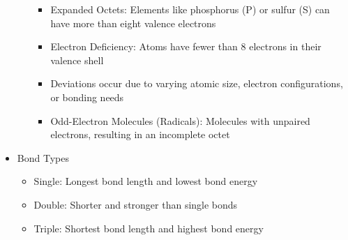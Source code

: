 \begin{itemize}
\begin{itemize}
        \begin{itemize}

          \item Expanded Octets: Elements like phosphorus (P) or sulfur (S) can have more than eight valence electrons

          \item Electron Deficiency: Atoms have fewer than 8 electrons in their valence shell

          \item Deviations occur due to varying atomic size, electron configurations, or bonding needs

          \item Odd-Electron Molecules (Radicals): Molecules with unpaired electrons, resulting in an incomplete octet

        \end{itemize}

    \end{itemize}

  \item Bond Types

    \begin{itemize}

      \item Single: Longest bond length and lowest bond energy

      \item Double: Shorter and stronger than single bonds

      \item Triple: Shortest bond length and highest bond energy

    \end{itemize}

\end{itemize}



